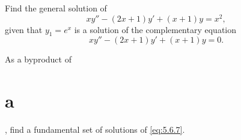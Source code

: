 \begin{example}
  \label{example:5.6.1} \rm \mbox{}
  \newline
  \begin{alist}
    \item %
    Find the general solution of
    \begin{equation}
      \label{eq:5.6.6}xy''-(2x+1)y'+(x+1)y=x^{2},
    \end{equation}
    given that $y_{1}=e^{x}$ is a solution of the complementary equation
    \begin{equation}
      \label{eq:5.6.7}xy''-(2x+1)y'+(x+1)y=0.
    \end{equation}

    \item %
    As a byproduct of \part{a}, find a fundamental set of solutions of \eqref{eq:5.6.7}.
  \end{alist}
\end{example}

